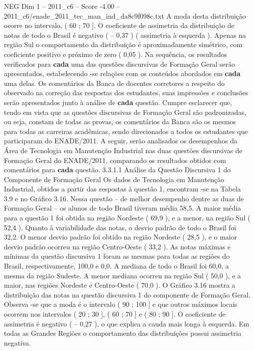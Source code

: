 \begin{textsample}{NEG Dim 1 – 2011\_c6 – Score -4.00 – 2011\_c6/enade\_2011\_tec\_man\_ind\_da8c9f098c.txt}
A moda desta distribuição ocorre no intervalo, ( 60 ; 70 ].
O coeficiente de assimetria da distribuição de notas de todo o Brasil é negativo ( – 0,37 ) ( assimetria à esquerda ).
Apenas na região Sul o comportamento da distribuição é aproximadamente simétrico, com coeficiente positivo e próximo de zero ( 0,05 ).
Na sequência, os resultados verificados para \textbf{cada} uma das questões discursivas de Formação Geral serão apresentados, estabelecendo -se relações com os conteúdos abordados em \textbf{cada} uma delas.
Os comentários da Banca de docentes corretores a respeito do observado na correção das respostas dos estudantes, suas impressões e conclusões serão apresentados junto à análise de \textbf{cada} questão.
Cumpre esclarecer que, tendo em vista que as questões discursivas de Formação Geral são padronizadas, ou seja, constam de todas as provas, os comentários da Banca são os mesmos para todas as carreiras acadêmicas, sendo direcionados a todos os estudantes que participaram do ENADE/2011.
A seguir, serão analisados os desempenhos da Área de Tecnologia em Manutenção Industrial nas duas questões discursivas de Formação Geral do ENADE/2011, comparando os resultados obtidos com comentários para \textbf{cada} questão. 3.3.1.1 Análise da Questão Discursiva 1 do Componente de Formação Geral Os dados de Tecnologia em Manutenção Industrial, obtidos a partir das respostas à questão 1, encontram -se na Tabela 3.9 e no Gráfico 3.16.
Nessa questão – de melhor desempenho dentre as duas de Formação Geral – os alunos de todo Brasil tiveram média 58,5.
A maior média para a questão 1 foi obtida na região Nordeste ( 69,9 ), e a menor, na região Sul ( 52,4 ).
Quanto à variabilidade das notas, o desvio padrão de todo o Brasil foi 32,2.
O menor desvio padrão foi obtido na região Nordeste ( 28,5 ), e o maior desvio padrão ocorreu na região Centro-Oeste ( 33,2 ).
As notas máximas e mínimas da questão discursiva 1 foram as mesmas para todas as regiões do Brasil, respectivamente, 100,0 e 0,0.
A mediana de todo o Brasil foi 60,0, a mesma da região Sudeste.
A menor mediana ocorreu na região Sul ( 50,0 ), e a maior, nas regiões Nordeste e Centro-Oeste ( 70,0 ).
O Gráfico 3.16 mostra a distribuição das notas na questão discursiva 1 do componente de Formação Geral.
Observa -se que a moda é o intervalo ( 90 ; 100 ] e que outros máximos locais ocorrem nos intervalos ( 20 ; 30 ], ( 60 ; 70 ] e ( 80 ; 90 ].
O coeficiente de assimetria é negativo ( – 0,27 ), o que explica a cauda mais longa à esquerda.
Em todas as Grandes Regiões o comportamento das distribuições possui assimetria negativa.

\end{textsample}
